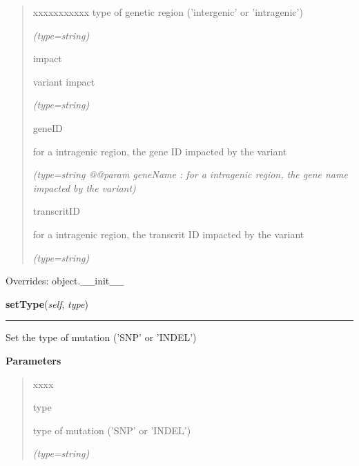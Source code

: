 \begin{boxedminipage}{\funcwidth}
\begin{quote}
\begin{Ventry}{xxxxxxxxxxx}
          type of genetic region ('intergenic' or 'intragenic')

            {\it (type=string)}

          \item[impact]

          variant impact

            {\it (type=string)}

          \item[geneID]

          for a intragenic region, the gene ID impacted by the variant

            {\it (type=string @@param geneName : for a intragenic region, the gene name impacted 
by the variant)}

          \item[transcritID]

          for a intragenic region, the transcrit ID impacted by the variant

            {\it (type=string)}

        \end{Ventry}

      \end{quote}

      Overrides: object.\_\_init\_\_

    \end{boxedminipage}

    \label{script-FixedVar:var:setType}

    \vspace{0.5ex}

\hspace{.8\funcindent}\begin{boxedminipage}{\funcwidth}

    \raggedright \textbf{setType}(\textit{self}, \textit{type})

    \vspace{-1.5ex}

    \rule{\textwidth}{0.5\fboxrule}
\setlength{\parskip}{2ex}
    Set the type of mutation ('SNP' or 'INDEL')

\setlength{\parskip}{1ex}
      \textbf{Parameters}
      \vspace{-1ex}

      \begin{quote}
        \begin{Ventry}{xxxx}

          \item[type]

          type of mutation ('SNP' or 'INDEL')

            {\it (type=string)}

        \end{Ventry}

      \end{quote}

    \end{boxedminipage}

